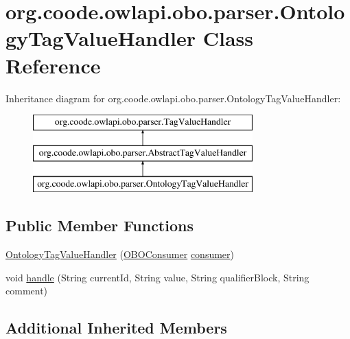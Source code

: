\hypertarget{classorg_1_1coode_1_1owlapi_1_1obo_1_1parser_1_1_ontology_tag_value_handler}{\section{org.\-coode.\-owlapi.\-obo.\-parser.\-Ontology\-Tag\-Value\-Handler Class Reference}
\label{classorg_1_1coode_1_1owlapi_1_1obo_1_1parser_1_1_ontology_tag_value_handler}
}
Inheritance diagram for org.\-coode.\-owlapi.\-obo.\-parser.\-Ontology\-Tag\-Value\-Handler\-:\begin{figure}[H]
\begin{center}
\leavevmode
\includegraphics[height=3.000000cm]{classorg_1_1coode_1_1owlapi_1_1obo_1_1parser_1_1_ontology_tag_value_handler}
\end{center}
\end{figure}
\subsection*{Public Member Functions}
\begin{DoxyCompactItemize}
\item 
\hyperlink{classorg_1_1coode_1_1owlapi_1_1obo_1_1parser_1_1_ontology_tag_value_handler_ad445adf4822ed1e53ec04a71869c6e50}{Ontology\-Tag\-Value\-Handler} (\hyperlink{classorg_1_1coode_1_1owlapi_1_1obo_1_1parser_1_1_o_b_o_consumer}{O\-B\-O\-Consumer} \hyperlink{classorg_1_1coode_1_1owlapi_1_1obo_1_1parser_1_1_abstract_tag_value_handler_ab27f1ff22d15640c5f81585f18265137}{consumer})
\item 
void \hyperlink{classorg_1_1coode_1_1owlapi_1_1obo_1_1parser_1_1_ontology_tag_value_handler_a9e3180ae94d3d4e4cac47596ece91e0c}{handle} (String current\-Id, String value, String qualifier\-Block, String comment)
\end{DoxyCompactItemize}
\subsection*{Additional Inherited Members}


